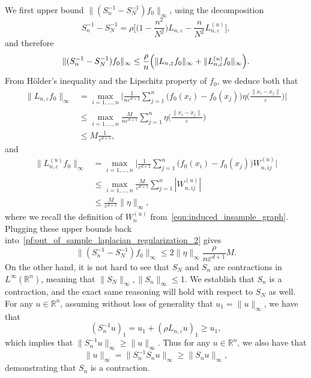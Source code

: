 \documentclass{article}
\newcommand{\Reals}{\mathbb{R}}
\newcommand{\1}{\mathbf{1}}
\theoremstyle{alden}
\theoremstyle{aldenthm}
\theoremstyle{definition}
\theoremstyle{remark}
\begin{document}
We first upper bound $\|(S_n^{-1} - S_N^{-1})f_0\|_{\infty}$, using the decomposition
\begin{equation*}
S_n^{-1} - S_N^{-1} = \rho \biggl[\biggl(1 - \frac{n^2}{N^2}\biggr)L_{n,\varepsilon} - \frac{n}{N^2}L_{n,\varepsilon}^{(u)}\biggr],
\end{equation*}
and therefore
\begin{equation}
\label{pf:out_of_sample_laplacian_regularization_2}
\|(S_n^{-1} - S_N^{-1})f_0\|_{\infty} \leq \frac{\rho}{n} \Bigl(\|L_{n,\varepsilon}f_0\|_{\infty} + \|L_{n,\varepsilon}^{(u)}f_0\|_{\infty} \Bigr).
\end{equation}
From H\"{o}lder's inequality and the Lipschitz property of $f_0$, we deduce both that
\begin{align*}
\|L_{n,\varepsilon}f_0\|_{\infty} & = \max_{i = 1,\ldots,n} \biggl| \frac{1}{n\varepsilon^{d + 2}}\sum_{j = 1}^{n} \bigl(f_0(x_i) - f_0(x_j)\bigr) \eta\biggl(\frac{\|x_i - x_j\|}{\varepsilon}\biggr) \biggr| \\
& \leq \max_{i = 1,\ldots,n}  \frac{M}{n\varepsilon^{d + 1}}\sum_{j = 1}^{n} \eta\biggl(\frac{\|x_i - x_j\|}{\varepsilon}\biggr) \\
& \leq M\frac{1}{\varepsilon^{d + 1}},
\end{align*}
and
\begin{align*}
\|L_{n,\varepsilon}^{(u)}f_0\|_{\infty} & = \max_{i = 1,\ldots,n} \biggl| \frac{1}{\varepsilon^{d + 2}} \sum_{j = 1}^{n} \bigl(f_0(x_i) - f_0(x_j)\bigr) W_{n,ij}^{(u)}\biggr| \\
& \leq \max_{i = 1,\ldots,n} \frac{M}{\varepsilon^{d + 1}} \sum_{j = 1}^{n} |W_{n,ij}^{(u)}|\\
& \leq \frac{M}{\varepsilon^{d + 1}} \|\eta\|_{\infty},
\end{align*}
where we recall the definition of $W_{n}^{(u)}$ from~\eqref{eqn:induced_insample_graph}. Plugging these upper bounds back into~\eqref{pf:out_of_sample_laplacian_regularization_2} gives
\begin{equation*}
\|(S_n^{-1} - S_N^{-1})f_0\|_{\infty} \leq 2 \|\eta\|_{\infty}\frac{\rho}{n\varepsilon^{d + 1}}M.
\end{equation*}
On the other hand, it is not hard to see that $S_N$ and $S_n$ are contractions in $L^{\infty}(\Reals^n)$, meaning that $\|S_N\|_{\infty},\|S_n\|_{\infty} \leq 1$. We establish that $S_n$ is a contraction, and the exact same reasoning will hold with respect to $S_N$ as well. For any $u \in \Reals^n$, assuming without loss of generality that $u_1 = \|u\|_{\infty}$, we have that
\begin{equation*}
(S_n^{-1}u)_1 = u_1 + (\rho L_{n,\varepsilon}u)_1 \geq u_1,
\end{equation*}
which implies that $\|S_n^{-1}u\|_{\infty} \geq \|u\|_{\infty}$. Thus for any $u \in \Reals^n$, we also have that
\begin{equation*}
\|u\|_{\infty} = \|S_n^{-1}S_nu\|_{\infty} \geq \|S_nu\|_{\infty},
\end{equation*}
demonstrating that $S_n$ is a contraction.
\end{document}
